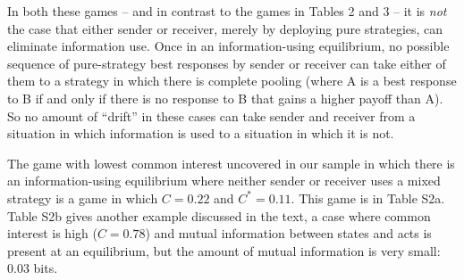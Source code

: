 \documentclass{article}
\begin{document}
In both these games -- and in contrast to the games in Tables 2 and 3 -- it
is \emph{not} the case that either sender or receiver, merely by deploying
pure strategies, can eliminate information use.  Once in an information-using equilibrium, no possible sequence of pure-strategy best responses by sender or receiver can take either of them to a strategy in which there is complete pooling (where A is a best response to B if and only if there is no response to B that gains a higher payoff than A). So no amount of ``drift'' in these cases can take sender and receiver from a situation in which information is used to a situation in which it is not.


The game with lowest common interest uncovered in our sample
in which there is an information-using equilibrium where neither
sender or receiver uses a mixed strategy is a game in which $C=0.22$
and $C^*=0.11$. This game is in Table S2a. Table S2b gives
another example discussed in the text, a case where common interest
is high ($C=0.78$) and mutual information between states and acts is
present at an equilibrium, but the amount of mutual information is very small: 0.03 bits.
\end{document}
